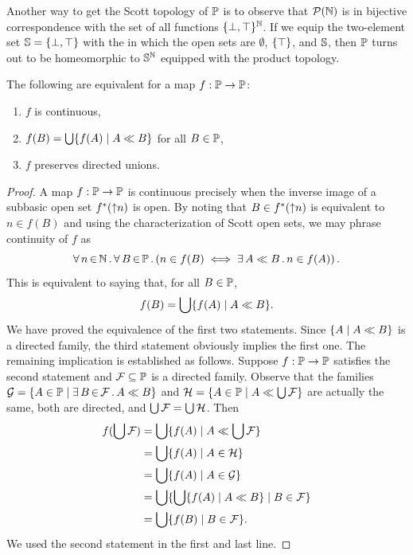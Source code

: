 Another way to get the Scott topology of $\mathbb{P}$ is to observe that
$\mathcal{P}(\mathbb{N})$ is in bijective correspondence with the set of all
functions $\{\bot, \top\}^{\mathbb{N}}$. If we equip the two-element set
$\mathbb{S} = \{\bot, \top\}$ with the  in
which the open sets are $\emptyset$, $\{\top\}$, and $\mathbb{S}$, then
$\mathbb{P}$ turns out to be homeomorphic to $\mathbb{S}^{\mathbb{N}}$ equipped with
the product topology.


\begin{proposition}
  The following are equivalent for a map $f : \mathbb{P} \to \mathbb{P}$:
  \begin{enumerate}
  \item $f$ is continuous,
  \item $f(B) = \bigcup\nolimits \{f(A) \mid A \ll B\}$ for all $B \in \mathbb{P}$,
  \item $f$ preserves directed unions.
  \end{enumerate}
\end{proposition}

\begin{proof}
  A map $f : \mathbb{P} \to \mathbb{P}$ is continuous precisely when the
  inverse image of a subbasic open set $f^{*}({\uparrow}n)$ is open.
  By noting that $B \in f^{*}({\uparrow}n)$ is equivalent to $n \in
  f(B)$ and using the characterization of Scott open sets, we may
  phrase continuity of $f$ as
  \begin{equation*}
    \forall\, n \,{\in}\, \mathbb{N}\,.\,
      \forall\, B \,{\in}\, \mathbb{P}\,.\left(
        n \in f(B) \iff \exists\, A \ll B\,.\,n \in f(A)
      \right)
   .
  \end{equation*}
  This is equivalent to saying that, for all $B \in \mathbb{P}$,
  \begin{equation*}
    f(B) = \bigcup\nolimits \{f(A) \mid A \ll B\}.
  \end{equation*}
  We have proved the equivalence of the first two statements. Since
  $\{A \mid A \ll B\}$ is a directed family, the third statement
  obviously implies the first one. The remaining implication is
  established as follows. Suppose $f : \mathbb{P} \to \mathbb{P}$ satisfies
  the second statement and $\mathcal{F} \subseteq \mathbb{P}$ is a
  directed family. Observe that the families $\mathcal{G} = \{A \in
    \mathbb{P} \mid \exists\, B \,{\in}\, \mathcal{F}\,.\,A \ll B\}$ and $\mathcal{H}
  = \{A \in \mathbb{P} \mid A \ll \bigcup\nolimits \mathcal{F}\}$ are
  actually the same, both are directed, and $\bigcup\nolimits \mathcal{F} =
  \bigcup\nolimits \mathcal{H}$. Then
  \begin{align*}
    f (\bigcup\nolimits \mathcal{F}) &=
    \bigcup\nolimits \{f(A) \mid A \ll \bigcup\nolimits \mathcal{F}\} \\
    &= \bigcup\nolimits \{f(A) \mid A \in \mathcal{H}\} \\
    &= \bigcup\nolimits \{f(A) \mid A \in \mathcal{G}\} \\
    &= \bigcup\nolimits \{\bigcup\nolimits \{f(A) \mid A \ll B\} \mid B \in \mathcal{F}\} \\
    &= \bigcup\nolimits \{f(B) \mid B \in \mathcal{F}\}.
  \end{align*}
  We used the second statement in the first and last line.
\end{proof}

